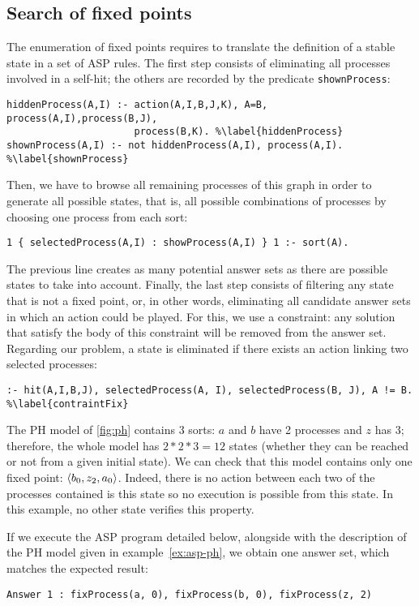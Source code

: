 \subsection{Search of fixed points}

The enumeration of fixed points requires to translate the definition of a stable state
in a set of ASP rules.
The first step consists of eliminating all processes involved in a self-hit;
the others are recorded by the predicate \texttt{shownProcess}:
\begin{lstlisting}
hiddenProcess(A,I) :- action(A,I,B,J,K), A=B, process(A,I),process(B,J),
                      process(B,K). %\label{hiddenProcess}
shownProcess(A,I) :- not hiddenProcess(A,I), process(A,I). %\label{shownProcess}
\end{lstlisting}
Then, we have to browse all remaining processes of this graph
in order to generate all possible states,
that is, all possible combinations of processes by choosing one process from each sort:
\begin{lstlisting}
1 { selectedProcess(A,I) : showProcess(A,I) } 1 :- sort(A).
\end{lstlisting}
The previous line creates as many potential answer sets as there are possible states
to take into account.
Finally, the last step consists of filtering any state that is not a fixed point,
or, in other words, eliminating all candidate answer sets in which an action could be played.
For this, we use a constraint:
any solution that satisfy the body of this constraint will be removed from the answer set.
Regarding our problem, a state is eliminated if there exists an action linking two selected processes:
\begin{lstlisting}
:- hit(A,I,B,J), selectedProcess(A, I), selectedProcess(B, J), A != B. %\label{contraintFix}
\end{lstlisting}

\begin{example}
The PH model of \ref{fig:ph} contains 3 sorts:
$a$ and $b$ have 2 processes and $z$ has 3; therefore, the whole model has $2*2*3 = 12$ states (whether they can be reached or not from a given initial state).
We can check that this model contains only one fixed point: $\mbox{$\langle b_0, z_2, a_0 \rangle$}$.
Indeed, there is no action between each two of the processes contained is this state so no execution is possible from this state. 
In this example, no other state verifies this property.

If we execute the ASP program detailed below,
alongside with the description of the PH model given in example~\ref{ex:asp-ph},
we obtain one answer set, which matches the expected result:
\begin{lstlisting}[numbers=none]
Answer 1 : fixProcess(a, 0), fixProcess(b, 0), fixProcess(z, 2)
\end{lstlisting}
\end{example}